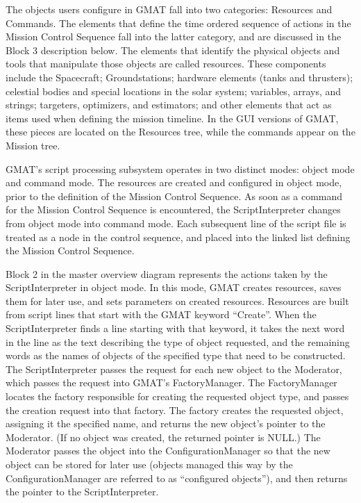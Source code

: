 The objects users configure in GMAT fall into two categories: Resources and Commands.  The elements
that define the time ordered sequence of actions in the Mission Control Sequence fall into the
latter category, and are discussed in the Block 3 description below.  The elements that identify the
physical objects and tools that manipulate those objects are called resources.  These components
include the Spacecraft; Groundstations; hardware elements (tanks and thrusters); celestial bodies
and special locations in the solar system; variables, arrays, and strings; targeters, optimizers,
and estimators; and other elements that act as items used when defining the mission timeline.  In
the GUI versions of GMAT, these pieces are located on the Resources tree, while the commands appear
on the Mission tree.

GMAT's script processing subsystem operates in two distinct modes: object mode and command mode.
The resources are created and configured in object mode, prior to the definition of the Mission
Control Sequence.  As soon as a command for the Mission Control Sequence is encountered, the
ScriptInterpreter changes from object mode into command mode.  Each subsequent line of the script
file is treated as a node in the control sequence, and placed into the linked list defining the
Mission Control Sequence.

Block 2 in the master overview diagram represents the actions taken by the ScriptInterpreter in
object mode.  In this mode, GMAT creates resources, saves them for later use, and sets parameters on
created resources.  Resources are built from script lines that start with the GMAT keyword
``Create''. When the ScriptInterpreter finds a line starting with that keyword, it takes the next
word in the line as the text describing the type of object requested, and the remaining words as the
names of objects of the specified type that need to be constructed.  The ScriptInterpreter passes
the request for each new object to the Moderator, which passes the request into GMAT's
FactoryManager.  The FactoryManager locates the factory responsible for creating the requested
object type, and passes the creation request into that factory.  The factory creates the requested
object, assigning it the specified name, and returns the new object's pointer to the Moderator.  (If
no object was created, the returned pointer is NULL.)  The Moderator passes the object into the
ConfigurationManager so that the new object can be stored for later use (objects managed this way by
the ConfigurationManager are referred to as ``configured objects''), and then returns the pointer to
the ScriptInterpreter.


